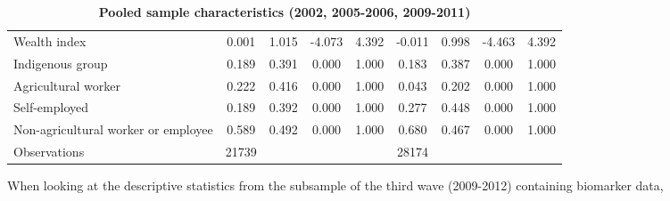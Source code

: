 \begin{table}[h!]
\begin{center}
{\begin{tabular}{l*{2}{cccc}}
Wealth index        &       0.001&       1.015&      -4.073&       4.392&      -0.011&       0.998&      -4.463&       4.392\\
Indigenous group    &       0.189&       0.391&       0.000&       1.000&       0.183&       0.387&       0.000&       1.000\\
Agricultural worker &       0.222&       0.416&       0.000&       1.000&       0.043&       0.202&       0.000&       1.000\\
Self-employed       &       0.189&       0.392&       0.000&       1.000&       0.277&       0.448&       0.000&       1.000\\
Non-agricultural worker or employee&       0.589&       0.492&       0.000&       1.000&       0.680&       0.467&       0.000&       1.000\\
\midrule
Observations        &       21739&            &            &            &       28174&            &            &            \\
\bottomrule
\end{tabular} }
\caption{\label{tab:Pooled-sample-characteristics}\textbf{Pooled sample characteristics
(2002, 2005-2006, 2009-2011) }}
\end{center}
\end{table}

When looking at the descriptive statistics from the subsample of the third wave (2009-2012) containing biomarker data, 

